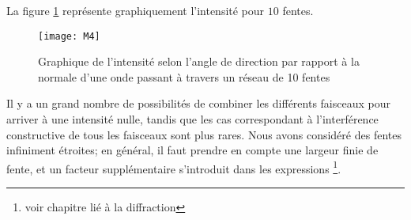 La figure \ref{M4} représente graphiquement l'intensité pour $10$ fentes.
\begin{figure}[htb]
\centering
\texttt{[image: M4]}
\caption{Graphique de l'intensité selon l'angle de direction par rapport à la normale d'une onde passant à travers un réseau de 10 fentes }
\label{M4}
\end{figure}

Il y a un grand nombre de possibilités de combiner les différents faisceaux pour arriver à une intensité nulle, tandis que les cas correspondant à l'interférence constructive de tous les faisceaux sont plus rares. Nous avons considéré des fentes infiniment étroites; en général, il faut prendre en compte une largeur finie de fente, et un facteur supplémentaire s'introduit dans les expressions \footnote{voir chapitre lié à la diffraction}.

